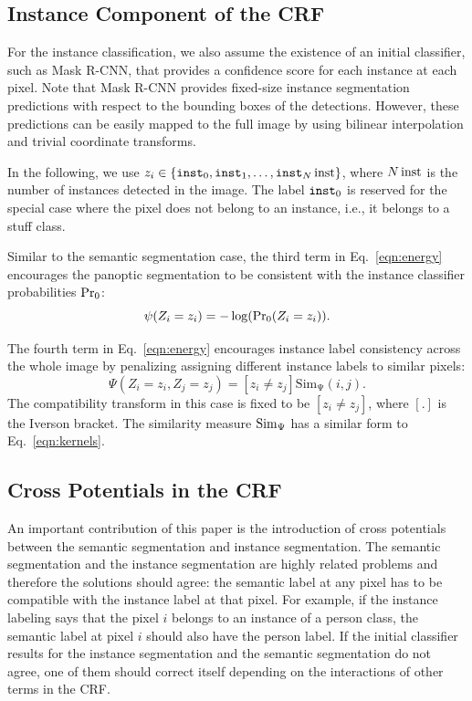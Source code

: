 \subsection{Instance Component of the CRF}

For the instance classification, we also assume the existence of an initial classifier, such as Mask R-CNN, that provides a confidence score for each instance at each pixel. Note that Mask R-CNN provides fixed-size instance segmentation predictions with respect to the bounding boxes of the detections. However, these predictions can be easily mapped to the full image by using bilinear interpolation and trivial coordinate transforms.

In the following, we use $z_i \in \{\texttt{inst}_0, \texttt{inst}_1, \dots, \texttt{inst}_N\operatorname{inst} \}$, where $N\operatorname{inst}$ is the number of instances detected in the image. The label $\texttt{inst}_0$ is reserved for the special case where the pixel does not belong to an instance, i.e., it belongs to a stuff class.

Similar to the semantic segmentation case, the third term in Eq.~\eqref{eqn:energy} encourages the panoptic segmentation to be consistent with the instance classifier probabilities $\operatorname{Pr_0}$:
\begin{equation}
\psi(Z_i = z_i) = - \log(\operatorname{Pr_0}(Z_i = z_i)).
\end{equation}

The fourth term in Eq.~\eqref{eqn:energy} encourages instance label consistency across the whole image by penalizing assigning different instance labels to similar pixels:
\begin{equation}
\Psi(Z_i = z_i, Z_j = z_j) = [z_i \neq z_j] \operatorname{Sim_\Psi}(i, j).
\end{equation}
The compatibility transform in this case is fixed to be $[z_i \neq z_j]$, where $[.]$ is the Iverson bracket. The similarity measure $\operatorname{Sim}_\Psi$ has a similar form to Eq.~\eqref{eqn:kernels}. %

\subsection{Cross Potentials in the CRF}
An important contribution of this paper is the introduction of cross potentials between the semantic segmentation and instance segmentation. The semantic segmentation and the instance segmentation are highly related problems and therefore the solutions should agree: the semantic label at any pixel has to be compatible with the instance label at that pixel. For example, if the instance labeling says that the pixel $i$ belongs to an instance of a person class, the semantic label at pixel $i$ should also have the person label. If the initial classifier results for the instance segmentation and the semantic segmentation do not agree, one of them should correct itself depending on the interactions of other terms in the CRF.

